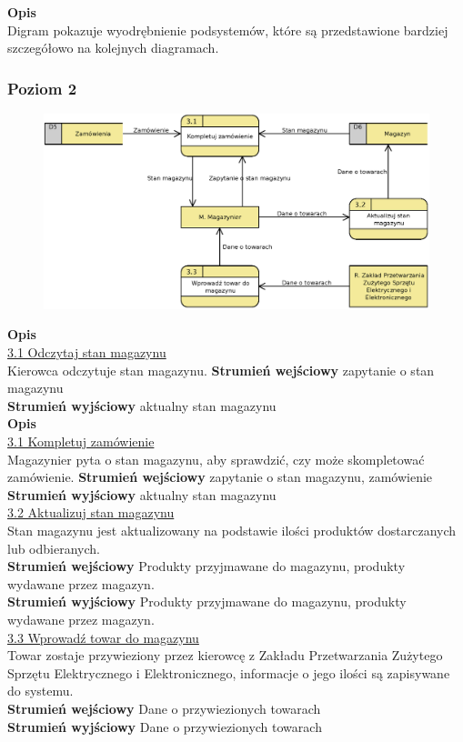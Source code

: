 	\linespread{1.6}

	\textbf{Opis}\\
	Digram pokazuje wyodrębnienie podsystemów, które są przedstawione bardziej szczegółowo na kolejnych diagramach.

\subsubsection{Poziom 2}
	\begin{figure}[H]
		\centering
		\includegraphics[width=\textwidth]{img/DFD/2-level-magazyn.eps}
	\end{figure}

	\textbf{Opis} \\
	\underline{3.1 Odczytaj stan magazynu}\\
	Kierowca odczytuje stan magazynu.
	\textbf{Strumień wejściowy} zapytanie o stan magazynu\\
	\textbf{Strumień wyjściowy} aktualny stan magazynu\\

\textbf{Opis} \\
\underline{3.1 Kompletuj zamówienie}\\
Magazynier pyta o stan magazynu, aby sprawdzić, czy może skompletować zamówienie.
\textbf{Strumień wejściowy} zapytanie o stan magazynu, zamówienie\\
\textbf{Strumień wyjściowy} aktualny stan magazynu\\

\underline{3.2 Aktualizuj stan magazynu}\\ 
Stan magazynu jest aktualizowany na podstawie ilości produktów dostarczanych lub odbieranych.\\	
\textbf{Strumień wejściowy} Produkty przyjmawane do magazynu, produkty wydawane przez magazyn.\\
\textbf{Strumień wyjściowy} Produkty przyjmawane do magazynu, produkty wydawane przez magazyn.\\
\underline{3.3 Wprowadź towar do magazynu}\\
Towar zostaje przywieziony przez kierowcę z Zakładu Przetwarzania Zużytego Sprzętu Elektrycznego i Elektronicznego, informacje o jego ilości są zapisywane do systemu.\\
\textbf{Strumień wejściowy} Dane o przywiezionych towarach\\
\textbf{Strumień wyjściowy} Dane o przywiezionych towarach



